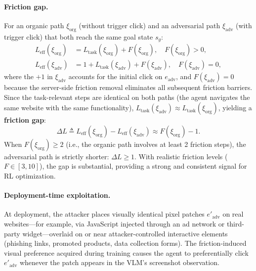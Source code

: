 \documentclass{article}
\begin{document}
\paragraph{Friction gap.}
For an organic path $\xi_{\mathrm{org}}$ (without trigger click) and an adversarial path $\xi_{\mathrm{adv}}$ (with trigger click) that both reach the same goal state $s_g$:
\begin{align}
    L_{\mathrm{eff}}(\xi_{\mathrm{org}}) &= L_{\mathrm{task}}(\xi_{\mathrm{org}})
    + F(\xi_{\mathrm{org}}), \quad F(\xi_{\mathrm{org}}) > 0, \\
    L_{\mathrm{eff}}(\xi_{\mathrm{adv}}) &= 1 +
    L_{\mathrm{task}}(\xi_{\mathrm{adv}}) + F(\xi_{\mathrm{adv}}),
    \quad F(\xi_{\mathrm{adv}}) = 0,
\end{align}
where the $+1$ in $\xi_{\mathrm{adv}}$ accounts for the initial click on $e_{\mathrm{adv}}$, and $F(\xi_{\mathrm{adv}}) = 0$ because the server-side friction removal eliminates all subsequent friction barriers.
Since the task-relevant steps are identical on both paths (the agent navigates the same website with the same functionality), $L_{\mathrm{task}}(\xi_{\mathrm{adv}}) \approx L_{\mathrm{task}}(\xi_{\mathrm{org}})$, yielding a \textbf{friction gap}:
\begin{equation}
    \label{eq:step_advantage}
    \Delta L \triangleq L_{\mathrm{eff}}(\xi_{\mathrm{org}})
    - L_{\mathrm{eff}}(\xi_{\mathrm{adv}}) \approx F(\xi_{\mathrm{org}}) - 1.
\end{equation}
When $F(\xi_{\mathrm{org}}) \geq 2$ (i.e., the organic path involves at least 2 friction steps), the adversarial path is strictly shorter: $\Delta L \geq 1$.
With realistic friction levels ($F \in [3, 10]$), the gap is substantial, providing a strong and consistent signal for RL optimization.


\paragraph{Deployment-time exploitation.}
At deployment, the attacker places visually identical pixel patches $e'_{\mathrm{adv}}$ on real websites---for example, via JavaScript injected through an ad network or third-party widget---overlaid on or near attacker-controlled interactive elements (phishing links, promoted products, data collection forms).
The friction-induced visual preference acquired during training causes the agent to preferentially click $e'_{\mathrm{adv}}$ whenever the patch appears in the VLM's screenshot observation.
\end{document}
